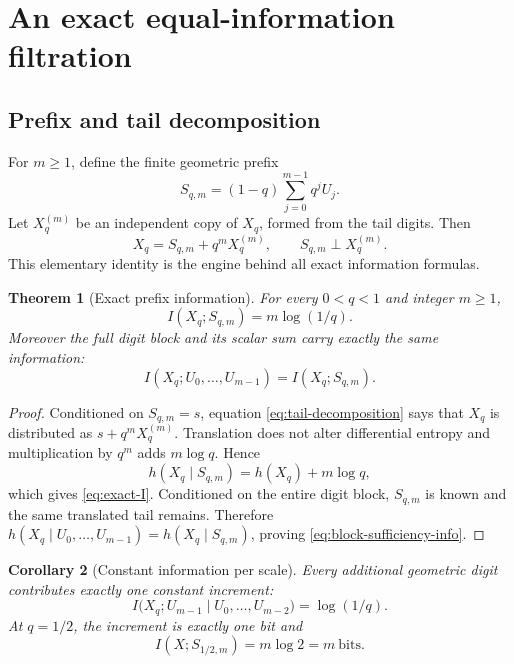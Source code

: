 \documentclass[11pt,oneside]{article}
\newtheorem{theorem}{Theorem}[section]
\newtheorem{corollary}[theorem]{Corollary}
\theoremstyle{definition}
\theoremstyle{remark}
\newcommand{\MI}{I}
\begin{document}
\section{An exact equal-information filtration}
\label{sec:exact-info}

\subsection{Prefix and tail decomposition}

For $m\ge1$, define the finite geometric prefix
\begin{equation}
 S_{q,m}=(1-q)\sum_{j=0}^{m-1}q^jU_j.
 \label{eq:prefix}
\end{equation}
Let $X_q^{(m)}$ be an independent copy of $X_q$, formed from the tail digits.  Then
\begin{equation}
 X_q=S_{q,m}+q^mX_q^{(m)},
 \qquad S_{q,m}\perp X_q^{(m)}.
 \label{eq:tail-decomposition}
\end{equation}
This elementary identity is the engine behind all exact information formulas.

\begin{theorem}[Exact prefix information]
\label{thm:prefix-information}
For every $0<q<1$ and integer $m\ge1$,
\begin{equation}
 \boxed{\MI(X_q;S_{q,m})=m\log(1/q).}
 \label{eq:exact-I}
\end{equation}
Moreover the full digit block and its scalar sum carry exactly the same information:
\begin{equation}
 \MI(X_q;U_0,\ldots,U_{m-1})
 =\MI(X_q;S_{q,m}).
 \label{eq:block-sufficiency-info}
\end{equation}
\end{theorem}

\begin{proof}
Conditioned on $S_{q,m}=s$, equation \eqref{eq:tail-decomposition} says that
$X_q$ is distributed as $s+q^mX_q^{(m)}$.  Translation does not alter differential
entropy and multiplication by $q^m$ adds $m\log q$.  Hence
\[
 h(X_q\mid S_{q,m})=h(X_q)+m\log q,
\]
which gives \eqref{eq:exact-I}.  Conditioned on the entire digit block,
$S_{q,m}$ is known and the same translated tail remains.  Therefore
$h(X_q\mid U_0,\ldots,U_{m-1})=h(X_q\mid S_{q,m})$, proving
\eqref{eq:block-sufficiency-info}.
\end{proof}

\begin{corollary}[Constant information per scale]
\label{cor:constant-digit-info}
Every additional geometric digit contributes exactly one constant increment:
\begin{equation}
 \MI\bigl(X_q;U_{m-1}\mid U_0,\ldots,U_{m-2}\bigr)=\log(1/q).
 \label{eq:digit-increment}
\end{equation}
At $q=1/2$, the increment is exactly one bit and
\begin{equation}
 \MI(X;S_{1/2,m})=m\log2=m\ \text{bits}.
 \label{eq:dyadic-bits}
\end{equation}
\end{corollary}
\end{document}
